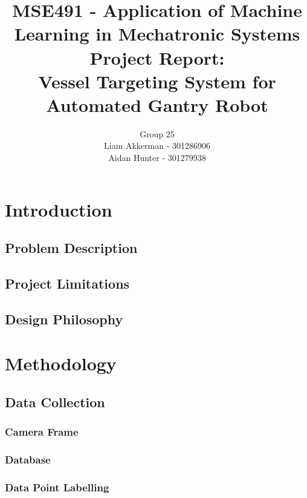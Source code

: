 \documentclass[11pt]{article}
\title{{\large MSE491 - Application of Machine Learning in Mechatronic Systems} \\ Project Report: \\ Vessel Targeting System for Automated Gantry Robot}
\author{Group 25 \\ Liam Akkerman - 301286906 \\ Aidan Hunter - 301279938}
\begin{document}
    \maketitle
    \vfill
	\setcounter{tocdepth}{2} %
    \tableofcontents %
    \FloatBarrier 
    \newpage

    \FloatBarrier
    \section{Introduction}
        \subsection{Problem Description}

        \subsection{Project Limitations}

        \subsection{Design Philosophy}

    \FloatBarrier
    \section{Methodology}
        \subsection{Data Collection}
            \subsubsection{Camera Frame}

            \subsubsection{Database}

            \subsubsection{Data Point Labelling}
\end{document}
